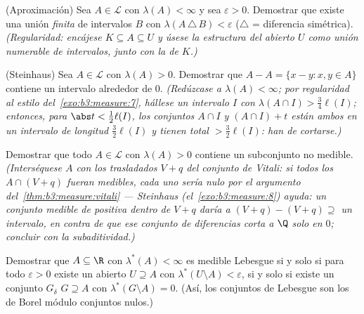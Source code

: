 \begin{exercise}[$\star\star$]\label{exo:b3:measure:7}
(Aproximación) Sea $A \in \mathcal L$ con $\lambda(A) <
\infty$ y sea $\varepsilon > 0$. Demostrar que existe una unión
\emph{finita} de intervalos $B$ con $\lambda(A\,\triangle\,B) <
\varepsilon$ ($\triangle$ = diferencia simétrica). \emph{(Regularidad:
encájese $K \subseteq A \subseteq U$ y úsese la estructura del abierto
$U$ como unión numerable de intervalos, junto con la  de
$K$.)}
\end{exercise}

\begin{exercise}[$\star\star\star$]\label{exo:b3:measure:8}
(Steinhaus) Sea $A \in \mathcal L$ con $\lambda(A) > 0$. Demostrar que
$A - A = \{x - y : x, y \in A\}$ contiene un intervalo alrededor de $0$.
\emph{(Redúzcase a $\lambda(A) < \infty$; por regularidad al estilo
del~\cref{exo:b3:measure:7}, hállese un intervalo $I$ con
$\lambda(A \cap I) > \frac34\ell(I)$; entonces, para $\abs t <
\frac12\ell(I)$, los conjuntos $A\cap I$ y $(A\cap I) + t$ están ambos
en un intervalo de longitud $\frac32\ell(I)$ y tienen
 total $> \frac32\ell(I)$: han de
cortarse.)}
\end{exercise}

\begin{exercise}[$\star\star\star$]\label{exo:b3:measure:9}
Demostrar que todo $A \in \mathcal L$ con $\lambda(A) > 0$ contiene un
subconjunto no medible. \emph{(Interséquese $A$ con los trasladados
$V + q$ del conjunto de Vitali: si todos los $A \cap (V+q)$ fueran
medibles, cada uno sería nulo por el argumento
del~\cref{thm:b3:measure:vitali} --- Steinhaus
(el~\cref{exo:b3:measure:8}) ayuda: un conjunto medible de
 positiva dentro de $V + q$ daría
a $(V+q) - (V+q) \supseteq$ un intervalo, en contra de que ese conjunto
de diferencias corta a $\Q$ solo en $0$; concluir con la
subaditividad.)}
\end{exercise}

\begin{exercise}[$\star\star$]\label{exo:b3:measure:10}
Demostrar que $A \subseteq \R$ con $\lambda^*(A) < \infty$ es medible
Lebesgue si y solo si para todo $\varepsilon > 0$ existe un abierto
$U \supseteq A$ con $\lambda^*(U \setminus A) <
\varepsilon$, si y solo si existe un conjunto $G_\delta$ $G \supseteq A$
con $\lambda^*(G\setminus A) = 0$. (Así, los conjuntos de Lebesgue son
los de Borel módulo conjuntos nulos.)
\end{exercise}

